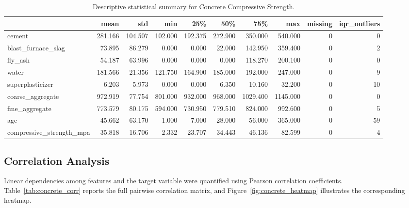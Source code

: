 \documentclass[11pt]{article}
\begin{document}
\begin{table}[H]
\centering
\small
\begin{tabular}{lrrrrrrrrr}
\toprule
 & mean & std & min & 25\% & 50\% & 75\% & max & missing & iqr\_outliers \\
\midrule
cement & 281.166 & 104.507 & 102.000 & 192.375 & 272.900 & 350.000 & 540.000 & 0 & 0 \\
blast\_furnace\_slag & 73.895 & 86.279 & 0.000 & 0.000 & 22.000 & 142.950 & 359.400 & 0 & 2 \\
fly\_ash & 54.187 & 63.996 & 0.000 & 0.000 & 0.000 & 118.270 & 200.100 & 0 & 0 \\
water & 181.566 & 21.356 & 121.750 & 164.900 & 185.000 & 192.000 & 247.000 & 0 & 9 \\
superplasticizer & 6.203 & 5.973 & 0.000 & 0.000 & 6.350 & 10.160 & 32.200 & 0 & 10 \\
coarse\_aggregate & 972.919 & 77.754 & 801.000 & 932.000 & 968.000 & 1029.400 & 1145.000 & 0 & 0 \\
fine\_aggregate & 773.579 & 80.175 & 594.000 & 730.950 & 779.510 & 824.000 & 992.600 & 0 & 5 \\
age & 45.662 & 63.170 & 1.000 & 7.000 & 28.000 & 56.000 & 365.000 & 0 & 59 \\
compressive\_strength\_mpa & 35.818 & 16.706 & 2.332 & 23.707 & 34.443 & 46.136 & 82.599 & 0 & 4 \\
\bottomrule
\end{tabular}

\caption{Descriptive statistical summary for Concrete Compressive Strength.}
\label{tab:concrete_summary}
\end{table}

\subsection{Correlation Analysis}
Linear dependencies among features and the target variable were quantified using Pearson correlation coefficients. Table~\ref{tab:concrete_corr} reports the full pairwise correlation matrix, and Figure~\ref{fig:concrete_heatmap} illustrates the corresponding heatmap.
\end{document}

